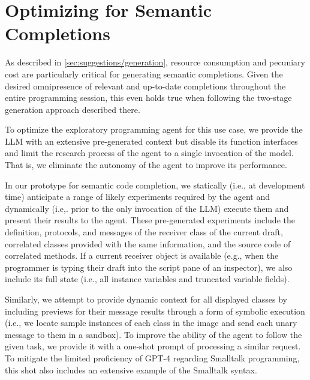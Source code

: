 
\section{Optimizing for Semantic Completions}
\label{sec:suggestions/completions}

As described in \cref{sec:suggestions/generation}, resource consumption and pecuniary cost are particularly critical for generating semantic completions.
Given the desired omnipresence of relevant and up-to-date completions throughout the entire programming session, this even holds true when following the two-stage generation approach described there.

To optimize the exploratory programming agent for this use case, we provide the LLM with an extensive pre-generated context but disable its function interfaces and limit the research process of the agent to a single invocation of the model.
That is, we eliminate the autonomy of the agent to improve its performance. %

In our prototype for semantic code completion, we statically (i.e., at development time) anticipate a range of likely experiments required by the agent and dynamically (i.e,. prior to the only invocation of the LLM) execute them and present their results to the agent.
These pre-generated experiments include the definition, protocols, and messages of the receiver class of the current draft, correlated classes provided with the same information, and the source code of correlated methods.
If a current receiver object is available (e.g., when the programmer is typing their draft into the script pane of an inspector), we also include its full state (i.e., all instance variables and truncated variable fields).

Similarly, we attempt to provide dynamic context for all displayed classes by including previews for their message results through a form of symbolic execution (i.e., we locate sample instances of each class in the image and send each unary message to them in a sandbox). %
To improve the ability of the agent to follow the given task, we provide it with a one-shot prompt of processing a similar request.
To mitigate the limited proficiency of GPT-4 regarding Smalltalk programming, this shot also includes an extensive example of the Smalltalk syntax.

